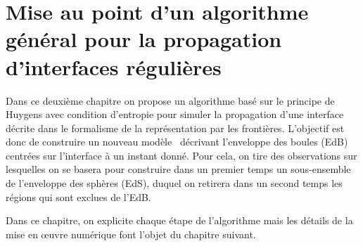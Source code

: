 \chapter[Algorithme général pour la propagation d'interfaces $\contgeom{1}$ \piecewise]{Mise au point d'un algorithme général pour la propagation d'interfaces régulières \piecewise}
\label{chap:algo_general}

\newcommand{\Right}[1]{\lo{#1}}%
\newcommand{\Left}[1]{\hi{#1}}%



Dans ce deuxième chapitre on propose un algorithme basé sur le principe de Huygens avec condition d'entropie pour simuler la propagation d'une interface décrite dans le formalisme de la représentation par les frontières. 
L'objectif est donc de construire un nouveau modèle \brep\ décrivant l'enveloppe des boules (EdB) centrées sur l'interface à un instant donné.
Pour cela, on tire des observations sur lesquelles on se basera pour construire dans un premier temps un sous-ensemble de l'enveloppe des sphères (EdS), duquel on retirera dans un second temps les régions qui sont exclues de l'EdB.
\par
Dans ce chapitre, on explicite chaque étape de l'algorithme mais les détails de la mise en \oe uvre numérique font l'objet du chapitre suivant.





